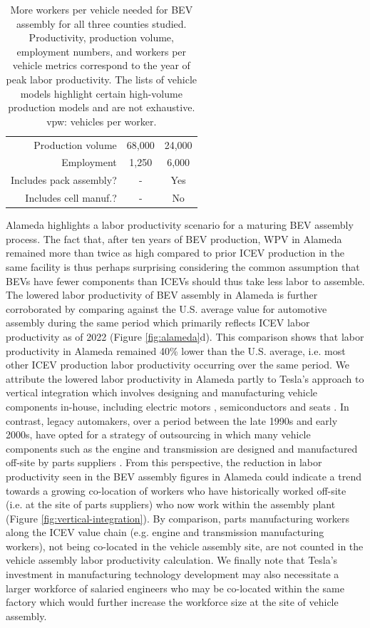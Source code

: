 \documentclass[sn-mathphys,Numbered]{sn-jnl}%
\begin{document}
\begin{table}
\begin{tabular}{rcc}
        Production volume & 68,000 & 24,000 \\
        Employment & 1,250 & 6,000 \\
        Includes pack assembly? & - & Yes \\
        Includes cell manuf.? & - & No \\
        \bottomrule
    \end{tabular}
    \caption{More workers per vehicle needed for BEV assembly for all three counties studied. Productivity, production volume, employment numbers, and workers per vehicle metrics correspond to the year of peak labor productivity. The lists of vehicle models highlight certain high-volume production models and are not exhaustive. vpw: vehicles per worker.}
    \label{tab:productivity-summary}
\end{table}

Alameda highlights a labor productivity scenario for a maturing BEV assembly process. The fact that, after ten years of BEV production, WPV in Alameda remained more than twice as high compared to prior ICEV production in the same facility is thus perhaps surprising considering the common assumption that BEVs have fewer components than ICEVs should thus take less labor to assemble. The lowered labor productivity of BEV assembly in Alameda is further corroborated by comparing against the U.S. average value for automotive assembly during the same period which primarily reflects ICEV labor productivity as of 2022 (Figure \ref{fig:alameda}d). This comparison shows that labor productivity in Alameda remained 40\% lower than the U.S. average, i.e. most other ICEV production labor productivity occurring over the same period. We attribute the lowered labor productivity in Alameda partly to Tesla's approach to vertical integration which involves designing and manufacturing vehicle components in-house, including electric motors \cite{Bellon2022-wx}, semiconductors \cite{Cohen2014-tx} and seats \cite{Field2019-mi}. In contrast, legacy automakers, over a period between the late 1990s and early 2000s, have opted for a strategy of outsourcing in which many vehicle components such as the engine and transmission are designed and manufactured off-site by parts suppliers \cite{Cutcher-Gershenfeld2015-pv, Chen2019-qr}. From this perspective, the reduction in labor productivity seen in the BEV assembly figures in Alameda could indicate a trend towards a growing co-location of workers who have historically worked off-site (i.e. at the site of parts suppliers) who now work within the assembly plant (Figure \ref{fig:vertical-integration}). By comparison, parts manufacturing workers along the ICEV value chain (e.g. engine and transmission manufacturing workers), not being co-located in the vehicle assembly site, are not counted in the vehicle assembly labor productivity calculation. We finally note that Tesla's investment in manufacturing technology development \cite{Cutcher-Gershenfeld2015-pv} may also necessitate a larger workforce of salaried engineers who may be co-located within the same factory \cite{Furr2020-hr} which would further increase the workforce size at the site of vehicle assembly.
\end{document}
